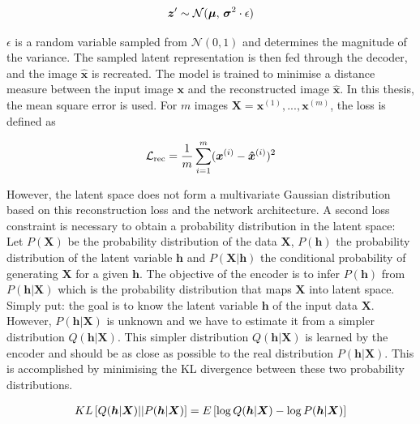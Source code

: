\begin{align}\eqlbl{hso_1}
	\boldsymbol{z}' \sim \mathcal{N}(\boldsymbol{\mu},\,\boldsymbol{\sigma}^{2} \cdot \epsilon)
\end{align}

$\epsilon$ is a random variable sampled from  $\mathcal{N}(0, 1)$ and determines the magnitude of the variance. The sampled latent representation is then fed through the decoder, and the image $\hat{\boldsymbol{x}}$ is recreated. The model is trained to minimise a distance measure between the input image $\boldsymbol{x}$ and the reconstructed image $\hat{\boldsymbol{x}}$. In this thesis, the mean square error is used. For $m$ images $\boldsymbol{X} = \boldsymbol{x}^{(1)}, ..., \boldsymbol{x}^{(m)}$, the loss is defined as

\begin{align}\eqlbl{hso_2}
	\mathcal{L}_{\text{rec}} = \frac{1}{m} \sum_{i=1}^{m} (\boldsymbol{x}^{(i)} - \boldsymbol{\hat{x}}^{(i)})^2
\end{align}

However, the latent space does not form a multivariate Gaussian distribution based on this reconstruction loss and the network architecture. A second loss constraint is necessary to obtain a probability distribution in the latent space: Let $P(\boldsymbol{X})$ be the probability distribution of the data $\boldsymbol{X}$, $P(\boldsymbol{h})$ the probability distribution of the latent variable $\boldsymbol{h}$ and $P(\boldsymbol{X}|\boldsymbol{h})$ the conditional probability of generating $\boldsymbol{X}$ for a given $\boldsymbol{h}$. The objective of the encoder is to infer $P(\boldsymbol{h})$ from $P(\boldsymbol{h}|\boldsymbol{X})$ which is the probability distribution that maps $\boldsymbol{X}$ into latent space. Simply put: the goal is to know the latent variable $\boldsymbol{h}$ of the input data $\boldsymbol{X}$.
However, $P(\boldsymbol{h}|\boldsymbol{X})$ is unknown and we have to estimate it from a simpler distribution $Q(\boldsymbol{h}|\boldsymbol{X})$. This simpler distribution $Q(\boldsymbol{h}|\boldsymbol{X})$ is learned by the encoder and should be as close as possible to the real distribution $P(\boldsymbol{h}|\boldsymbol{X})$. This is accomplished by minimising the KL divergence between these two probability distributions.

\begin{align}\eqlbl{hso_3}
	KL \left[ Q(\boldsymbol{h}|\boldsymbol{X}) || P(\boldsymbol{h}|\boldsymbol{X}) \right] = E \left[ \log Q(\boldsymbol{h}|\boldsymbol{X}) - \log P(\boldsymbol{h}|\boldsymbol{X}) \right]
\end{align}

